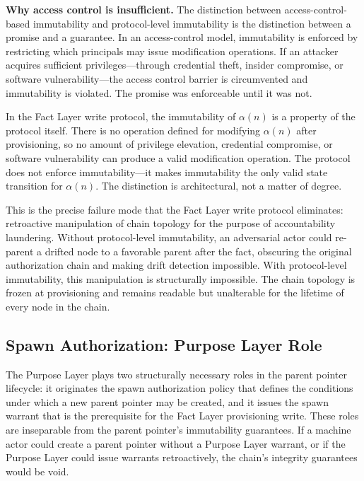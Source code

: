 \bigskip
\noindent\textbf{Why access control is insufficient.} The distinction between access-control-based immutability and protocol-level immutability is the distinction between a promise and a guarantee. In an access-control model, immutability is enforced by restricting which principals may issue modification operations. If an attacker acquires sufficient privileges---through credential theft, insider compromise, or software vulnerability---the access control barrier is circumvented and immutability is violated. The promise was enforceable until it was not.

In the Fact Layer write protocol, the immutability of $\alpha(n)$ is a property of the protocol itself. There is no operation defined for modifying $\alpha(n)$ after provisioning, so no amount of privilege elevation, credential compromise, or software vulnerability can produce a valid modification operation. The protocol does not enforce immutability---it makes immutability the only valid state transition for $\alpha(n)$. The distinction is architectural, not a matter of degree.

This is the precise failure mode that the Fact Layer write protocol eliminates: retroactive manipulation of chain topology for the purpose of accountability laundering. Without protocol-level immutability, an adversarial actor could re-parent a drifted node to a favorable parent after the fact, obscuring the original authorization chain and making drift detection impossible. With protocol-level immutability, this manipulation is structurally impossible. The chain topology is frozen at provisioning and remains readable but unalterable for the lifetime of every node in the chain.

\subsection{Spawn Authorization: Purpose Layer Role}
\label{sec:purpose-layer-authorization}

The Purpose Layer plays two structurally necessary roles in the parent pointer lifecycle: it originates the spawn authorization policy that defines the conditions under which a new parent pointer may be created, and it issues the spawn warrant that is the prerequisite for the Fact Layer provisioning write. These roles are inseparable from the parent pointer's immutability guarantees. If a machine actor could create a parent pointer without a Purpose Layer warrant, or if the Purpose Layer could issue warrants retroactively, the chain's integrity guarantees would be void.

